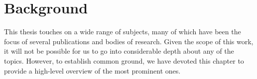 \chapter{Background}

This thesis touches on a wide range of subjects, many of which have been the focus of several publications and bodies of research. Given the scope of this work, it will not be possible for us to go into considerable depth about any of the topics. However, to establish common ground, we have devoted this chapter to provide a high-level overview of the most prominent ones.





